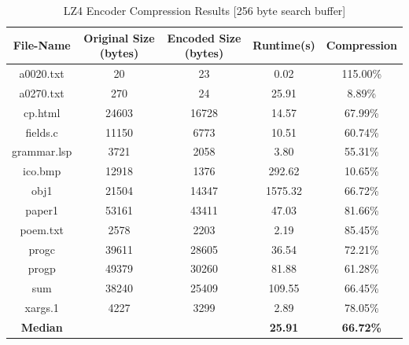 \documentclass[12pt]{article}
\begin{document}
\begin{table}[H]
	\centering
	\begin{tabular}{| c | c | c | c | c |} 
		\hline
		File-Name & Original Size (bytes) & Encoded Size (bytes) & Runtime(s) & Compression\\
		\hline
		a0020.txt & 20 & 23 & 0.02 & 115.00\%\\
		\hline
		a0270.txt & 270 & 24 & 25.91 & 8.89\%\\
		\hline
		cp.html & 24603 & 16728 & 14.57 & 67.99\%\\
		\hline
		fields.c & 11150 & 6773 & 10.51 & 60.74\%\\
		\hline
		grammar.lsp & 3721 & 2058 & 3.80 & 55.31\%\\
		\hline
		ico.bmp & 12918 & 1376 & 292.62 & 10.65\%\\
		\hline
		obj1 & 21504 & 14347 & 1575.32 & 66.72\%\\
		\hline
		paper1 & 53161 & 43411 & 47.03 & 81.66\%\\
		\hline
		poem.txt & 2578 & 2203 & 2.19 & 85.45\%\\
		\hline
		progc & 39611 & 28605 & 36.54 & 72.21\%\\
		\hline
		progp & 49379 & 30260 & 81.88 & 61.28\%\\
		\hline
		sum & 38240 & 25409 & 109.55 & 66.45\%\\
		\hline
		xargs.1 & 4227 & 3299 & 2.89 & 78.05\%\\
		\Xhline{3\arrayrulewidth}
		\textbf{Median} & & & \textbf{25.91} & \textbf{66.72\%}\\
		\hline
	\end{tabular}
	\caption{LZ4 Encoder Compression Results [256 byte search buffer]}
	\label{lz4_enc_results256}
\end{table}
\end{document}
